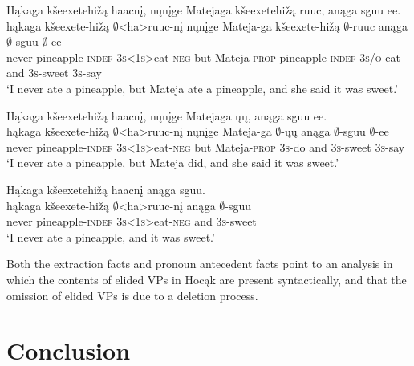\documentclass[output=paper]{LSP/langsci}
\begin{document}
 
\ea
\ea\label{ex:johnson:51a} 
\glll Hąkaga kšeexetehižą haacnį, nųnįge Matejaga kšeexetehižą ruuc, anąga sguu ee.\\
hąkaga kšeexete-hižą $\emptyset$<ha>ruuc-nį nųnįge Mateja-ga kšeexete-hižą $\emptyset$-ruuc anąga $\emptyset$-sguu $\emptyset$-ee\\
never pineapple-\textsc{indef} \textsc{3s<1s>}eat-\textsc{neg} but Mateja-\textsc{prop} pineapple-\textsc{indef} \textsc{3s/o}-eat and \textsc{3s}-sweet \textsc{3s}-say\\
\trans `I never ate a pineapple, but Mateja ate a pineapple, and she said it was sweet.'
 
\ex\label{ex:johnson:51b} 
\glll Hąkaga kšeexetehižą haacnį, nųnįge Matejaga ųų, anąga sguu ee.\\
hąkaga kšeexete-hižą $\emptyset$<ha>ruuc-nį nųnįge Mateja-ga $\emptyset$-ųų anąga $\emptyset$-sguu $\emptyset$-ee\\
never pineapple-\textsc{indef} \textsc{3s<1s>}eat-\textsc{neg} but Mateja-\textsc{prop} \textsc{3s}-do and \textsc{3s}-sweet \textsc{3s}-say\\
\trans `I never ate a pineapple, but Mateja did, and she said it was sweet.'
\z
\z
 
\ea\label{ex:johnson:52} 
\glll Hąkaga kšeexetehižą haacnį anąga sguu.\\
hąkaga kšeexete-hižą $\emptyset$<ha>ruuc-nį anąga $\emptyset$-sguu\\
never pineapple-\textsc{indef} \textsc{3s<1s>}eat-\textsc{neg} and \textsc{3s}-sweet\\
\trans `I never ate a pineapple, and it was sweet.'
\z


Both the extraction facts and pronoun antecedent facts point to an analysis in which the contents of elided VPs in Hocąk are present syntactically, and that the omission of elided VPs is due to a deletion process.

\section{Conclusion}\label{sec:johnson:5}
\end{document}
